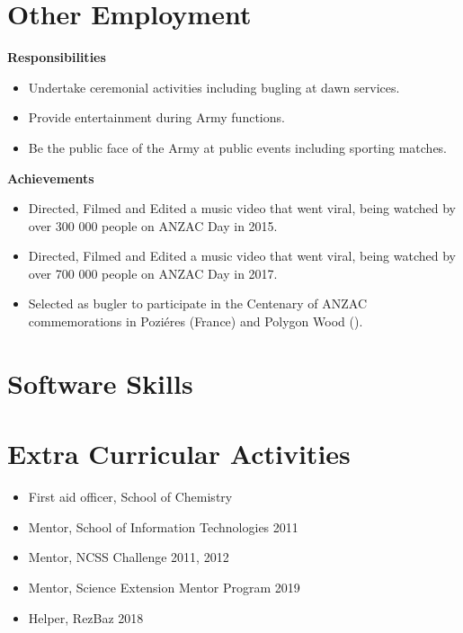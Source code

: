\pagebreak
\section{Other Employment}

{}{}
{%
\textbf{Responsibilities}
\begin{itemize}
  \item Undertake ceremonial activities including bugling at dawn services.
  \item Provide entertainment during Army functions.
  \item Be the public face of the Army at public events including sporting matches.
\end{itemize}
\textbf{Achievements}
\begin{itemize}
  \item Directed, Filmed and Edited a music video  that went viral, being watched by over 300 000 people on ANZAC Day in 2015.
  \item Directed, Filmed and Edited a music video  that went viral, being watched by over 700 000 people on ANZAC Day in 2017.
  \item Selected as bugler to participate in the Centenary of ANZAC commemorations in Poziéres (France) and Polygon Wood ().
\end{itemize}
}

\section{Software Skills}


\section{Extra Curricular Activities}

{%
  \begin{itemize}
    \item First aid officer, School of Chemistry
    \item Mentor, School of Information Technologies 2011
    \item Mentor, NCSS Challenge 2011, 2012
    \item Mentor, Science Extension Mentor Program 2019
    \item Helper, RezBaz 2018
  \end{itemize}
}

